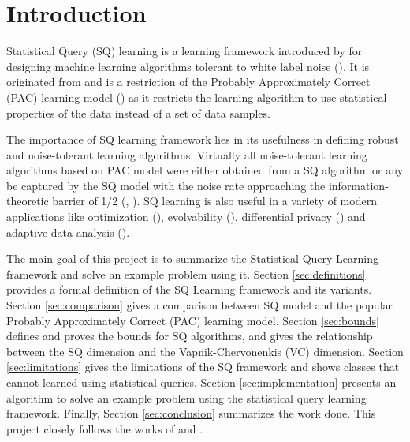\section{Introduction}
Statistical Query (SQ) learning is a learning framework introduced by \cite{kearns_efficient_1998} for designing machine learning algorithms tolerant to white label noise (\cite{angluin_learning_1988}). It is originated from and is a restriction of the Probably Approximately Correct (PAC) learning model (\cite{valiant_theory_1984}) as it restricts the learning algorithm to use statistical properties of the data instead of a set of data samples.

The importance of SQ learning framework lies in its usefulness in defining robust and noise-tolerant learning algorithms. Virtually all noise-tolerant learning algorithms based on PAC model were either obtained from a SQ algorithm or any be captured by the SQ model with the noise rate approaching the information-theoretic barrier of 1/2 (\cite{kearns_efficient_1998}, \cite{feldman_statistical_2008}). SQ learning is also useful in a variety of modern applications like optimization (\cite{feldman_statistical_2017}), evolvability (\cite{feldman_evolvability_2008}), differential privacy (\cite{dwork_calibrating_2006}) and adaptive data analysis (\cite{dwork_reusable_2015}).



The main goal of this project is to summarize the Statistical Query Learning framework and solve an example problem using it. Section \ref{sec:definitions} provides a formal definition of the SQ Learning framework and its variants. Section \ref{sec:comparison} gives a comparison between SQ model and the popular Probably Approximately Correct (PAC) learning model. Section \ref{sec:bounds} defines and proves the bounds for SQ algorithms, and gives the relationship between the SQ dimension and the Vapnik-Chervonenkis (VC) dimension. Section \ref{sec:limitations} gives the limitations of the SQ framework and shows classes that cannot learned using statistical queries. Section \ref{sec:implementation} presents an algorithm to solve an example problem using the statistical query learning framework. Finally, Section \ref{sec:conclusion} summarizes the work done. This project closely follows the works of \citet{reyzin_statistical_2020} and \citet{feldman_statistical_2008}.


